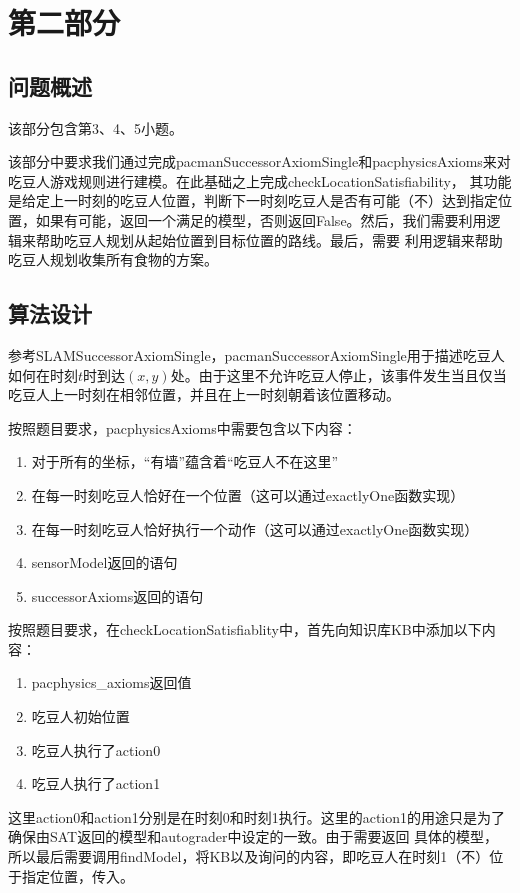\chapter{第二部分}
\section{问题概述}
%
%
%
%
%
%
该部分包含第3、4、5小题。

该部分中要求我们通过完成pacmanSuccessorAxiomSingle和pacphysicsAxioms来对吃豆人游戏规则进行建模。在此基础之上完成checkLocationSatisfiability，
其功能是给定上一时刻的吃豆人位置，判断下一时刻吃豆人是否有可能（不）达到指定位置，如果有可能，返回一个满足的模型，否则返回False。然后，我们需要利用逻辑来帮助吃豆人规划从起始位置到目标位置的路线。最后，需要
利用逻辑来帮助吃豆人规划收集所有食物的方案。
\section{算法设计}
%
%
参考SLAMSuccessorAxiomSingle，pacmanSuccessorAxiomSingle用于描述吃豆人如何在时刻$t$时到达$(x,y)$处。由于这里不允许吃豆人停止，该事件发生当且仅当
吃豆人上一时刻在相邻位置，并且在上一时刻朝着该位置移动。

按照题目要求，pacphysicsAxioms中需要包含以下内容：
\begin{enumerate}
    \item 对于所有的坐标，“有墙”蕴含着“吃豆人不在这里”
    \item 在每一时刻吃豆人恰好在一个位置（这可以通过exactlyOne函数实现）
    \item 在每一时刻吃豆人恰好执行一个动作（这可以通过exactlyOne函数实现）
    \item sensorModel返回的语句
    \item successorAxioms返回的语句
\end{enumerate}

按照题目要求，在checkLocationSatisfiablity中，首先向知识库KB中添加以下内容：
\begin{enumerate}
    \item pacphysics\_axioms返回值
    \item 吃豆人初始位置
    \item 吃豆人执行了action0
    \item 吃豆人执行了action1
\end{enumerate}
这里action0和action1分别是在时刻0和时刻1执行。这里的action1的用途只是为了确保由SAT返回的模型和autograder中设定的一致。由于需要返回
具体的模型，所以最后需要调用findModel，将KB以及询问的内容，即吃豆人在时刻1（不）位于指定位置，传入。

